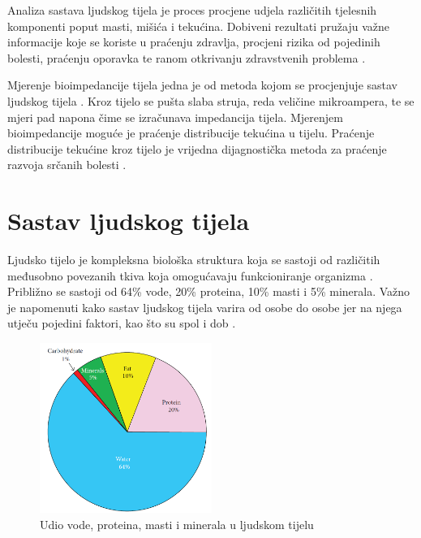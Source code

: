 \documentclass[../diplomski_rad.tex]{subfiles}
\begin{document}
\sloppy

\justifying

Analiza sastava ljudskog tijela je proces procjene udjela različitih tjelesnih komponenti 
poput masti, mišića i tekućina.
Dobiveni rezultati pružaju važne informacije koje se koriste u praćenju zdravlja, 
procjeni rizika od pojedinih bolesti, praćenju oporavka te ranom otkrivanju zdravstvenih problema \cite{Mialich2014}.

Mjerenje bioimpedancije tijela jedna je od metoda kojom se procjenjuje sastav ljudskog tijela \cite{Bera2014}. 
Kroz tijelo se pušta slaba struja, reda veličine mikroampera, te se mjeri pad napona čime se izračunava impedancija tijela. 
Mjerenjem bioimpedancije moguće je praćenje distribucije tekućina u tijelu. 
Praćenje distribucije tekućine kroz tijelo je vrijedna dijagnostička metoda 
za praćenje razvoja srčanih bolesti \cite{Abassi2022}.

\section{Sastav ljudskog tijela}

Ljudsko tijelo je kompleksna biološka struktura koja se sastoji od različitih međusobno povezanih tkiva koja 
omogućavaju funkcioniranje organizma \cite{Bera2014}. Približno se sastoji od 
64\% vode,
20\% proteina,
10\% masti 
i 5\% minerala.
Važno je napomenuti kako sastav ljudskog tijela varira od osobe do osobe jer na njega utječu 
pojedini faktori, kao što su spol i dob \cite{Bera2014}.  

\begin{figure}[htb]
    \centering
    \includegraphics[width=0.5\textwidth]{Figures/sastav_tijela_2.png} 
    \caption{Udio vode, proteina, masti i minerala u ljudskom tijelu \cite{Bera2014}}
    \label{slk:sastav_tijela}
\end{figure}
\end{document}
